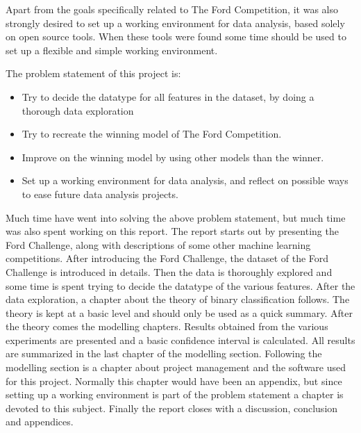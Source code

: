 Apart from the goals specifically related to The Ford Competition, it was also strongly desired to set up a working environment for data analysis, based solely on open source tools. When these tools were found some time should be used to set up a flexible and simple working environment. \par

The problem statement of this project is:
\begin{itemize}
    \item Try to decide the datatype for all features in the dataset, by doing a thorough data exploration
    \item Try to recreate the winning model of The Ford Competition.
    \item Improve on the winning model by using other models than the winner.
    \item Set up a working environment for data analysis, and reflect on possible ways to ease future data analysis projects.
\end{itemize}

Much time have went into solving the above problem statement, but much time was also spent working on this report. The report starts out by presenting the Ford Challenge, along with descriptions of some other machine learning competitions. After introducing the Ford Challenge, the dataset of the Ford Challenge is introduced in details. Then the data is thoroughly explored and some time is spent trying to decide the datatype of the various features. After the data exploration, a chapter about the theory of binary classification follows. The theory is kept at a basic level and should only be used as a quick summary. After the theory comes the modelling chapters. Results obtained from the various experiments are presented and a basic confidence interval is calculated. All results are summarized in the last chapter of the modelling section. Following the modelling section is a chapter about project management and the software used for this project. Normally this chapter would have been an appendix, but since setting up a working environment is part of the problem statement a chapter is devoted to this subject. Finally the report closes with a discussion, conclusion and appendices.
